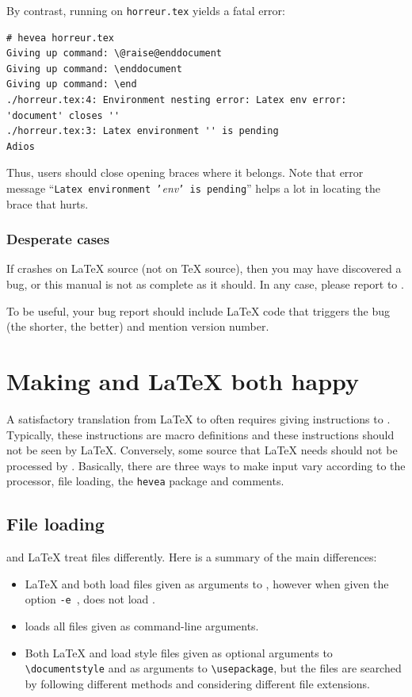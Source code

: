 By contrast, running \hevea{} on \texttt{horreur.tex} yields a fatal error:
\begin{verbatim}
# hevea horreur.tex 
Giving up command: \@raise@enddocument
Giving up command: \enddocument
Giving up command: \end
./horreur.tex:4: Environment nesting error: Latex env error: 'document' closes ''
./horreur.tex:3: Latex environment '' is pending
Adios
\end{verbatim}
Thus, users should close opening braces where it belongs.
Note that \hevea{} error message ``\texttt{Latex environment
'}\textit{env}\texttt{' is pending}'' helps a lot in locating
the brace that hurts.

\subsubsection{Desperate cases}

If \hevea{} crashes on \LaTeX{} source (not on \TeX{} source),
then you may have discovered a bug, or this manual is not as complete
as it should.
In any case, please report to .

To be useful, your bug report should include \LaTeX{} code
that triggers the bug (the shorter, the better) and mention
\hevea{} version number.


\section{\label{both}Making \hevea{} and \LaTeX{} both happy}
A satisfactory translation from \LaTeX{} to \html{} often requires
giving instructions to \hevea{}.
Typically, these instructions are macro definitions and
these instructions should not be seen by \LaTeX{}.
Conversely, some source that \LaTeX{} needs should not be processed
by \hevea{}.
Basically, there are three ways to make input vary according to the
processor, file loading, the \texttt{hevea} package
and comments.


\subsection{File loading}\label{fileloading}

\hevea{} and \LaTeX{} treat files differently. Here is a summary of the main
differences:

\begin{itemize}
  \item \LaTeX{} and \hevea{} both load files given as arguments to
  \verb++, however when given the option \verb+-e+~,
  \hevea{} does not load .
  \item \hevea{} loads all files given as command-line arguments.
  \item Both \LaTeX{} and \hevea{} load style files given as optional
  arguments to 
  \verb+\documentstyle+ and as arguments to \verb+\usepackage+,
  but the files are searched by following different methods and
  considering different file extensions.  
\end{itemize}

